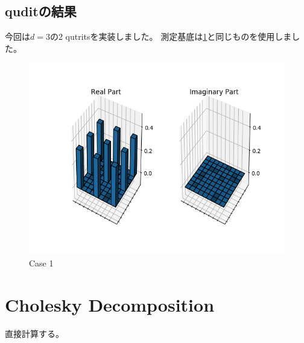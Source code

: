 \documentclass[11pt,a4j,notitlepage]{jreport}
\begin{document}
	\section{quditの結果}

	今回は$d=3$の2 qutritsを実装しました。
	測定基底は\ref{}と同じものを使用しました。

	\begin{figure}[htbp]
		\centering
			\includegraphics[clip,width=12.0cm]{./picture/qutrit.png}
			\caption{Case 1}
	\end{figure}


	\appendix

	\chapter{Cholesky Decomposition}
	\label{chap:Cholesky}

	直接計算する。\\
\end{document}
